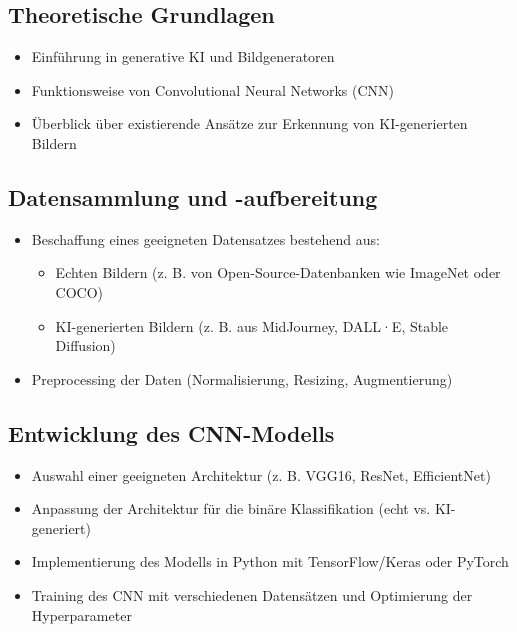 \documentclass[a4paper,12pt]{article}
\begin{document}
\subsection{Theoretische Grundlagen}

\begin{itemize}
    \item Einführung in generative KI und Bildgeneratoren
    \item Funktionsweise von Convolutional Neural Networks (CNN)
    \item Überblick über existierende Ansätze zur Erkennung von KI-generierten Bildern
\end{itemize}

\subsection{Datensammlung und -aufbereitung}

\begin{itemize}
    \item Beschaffung eines geeigneten Datensatzes bestehend aus:
    \begin{itemize}
        \item Echten Bildern (z. B. von Open-Source-Datenbanken wie ImageNet oder COCO)
        \item KI-generierten Bildern (z. B. aus MidJourney, DALL·E, Stable Diffusion)
    \end{itemize}
    \item Preprocessing der Daten (Normalisierung, Resizing, Augmentierung)
\end{itemize}

\subsection{Entwicklung des CNN-Modells}

\begin{itemize}
    \item Auswahl einer geeigneten Architektur (z. B. VGG16, ResNet, EfficientNet)
    \item Anpassung der Architektur für die binäre Klassifikation (echt vs. KI-generiert)
    \item Implementierung des Modells in Python mit TensorFlow/Keras oder PyTorch
    \item Training des CNN mit verschiedenen Datensätzen und Optimierung der Hyperparameter
\end{itemize}
\end{document}
